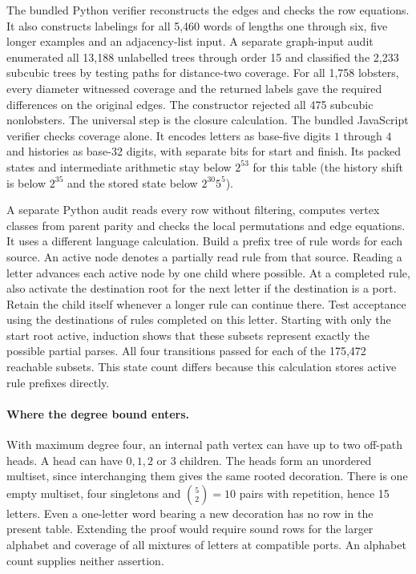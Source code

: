 \documentclass[11pt,a4paper]{article}
\begin{document}
The bundled Python verifier reconstructs the edges and checks the row equations. It also constructs labelings for all 5,460 words of lengths one through six, five longer examples and an adjacency-list input. A separate graph-input audit enumerated all 13,188 unlabelled trees through order 15 and classified the 2,233 subcubic trees by testing paths for distance-two coverage. For all 1,758 lobsters, every diameter witnessed coverage and the returned labels gave the required differences on the original edges. The constructor rejected all 475 subcubic nonlobsters. The universal step is the closure calculation. The bundled JavaScript verifier checks coverage alone. It encodes letters as base-five digits $1$ through $4$ and histories as base-32 digits, with separate bits for start and finish. Its packed states and intermediate arithmetic stay below $2^{53}$ for this table (the history shift is below $2^{35}$ and the stored state below $2^{30}5^5$).

A separate Python audit reads every row without filtering, computes vertex classes from parent parity and checks the local permutations and edge equations. It uses a different language calculation. Build a prefix tree of rule words for each source. An active node denotes a partially read rule from that source. Reading a letter advances each active node by one child where possible. At a completed rule, also activate the destination root for the next letter if the destination is a port. Retain the child itself whenever a longer rule can continue there. Test acceptance using the destinations of rules completed on this letter. Starting with only the start root active, induction shows that these subsets represent exactly the possible partial parses. All four transitions passed for each of the 175,472 reachable subsets. This state count differs because this calculation stores active rule prefixes directly.

\paragraph{Where the degree bound enters.} With maximum degree four, an internal path vertex can have up to two off-path heads. A head can have $0,1,2$ or $3$ children. The heads form an unordered multiset, since interchanging them gives the same rooted decoration. There is one empty multiset, four singletons and $\binom{5}{2}=10$ pairs with repetition, hence 15 letters. Even a one-letter word bearing a new decoration has no row in the present table. Extending the proof would require sound rows for the larger alphabet and coverage of all mixtures of letters at compatible ports. An alphabet count supplies neither assertion.
\end{document}
